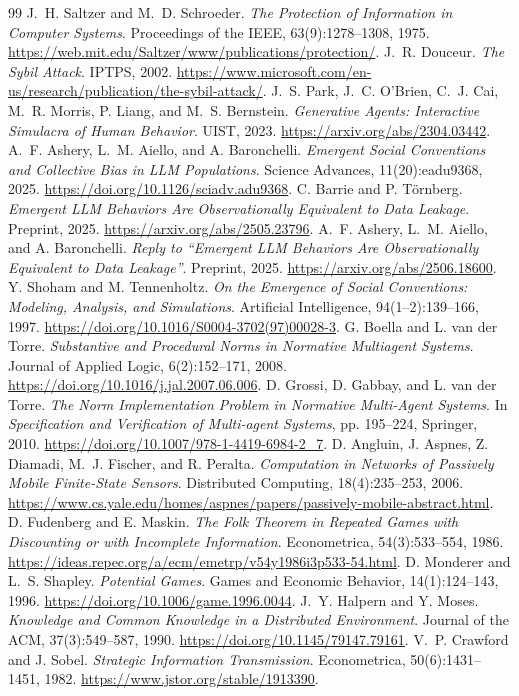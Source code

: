 \documentclass[11pt,oneside,openany]{book}
\numberwithin{equation}{section}
\begin{document}
\begin{thebibliography}{99}
 J.~H. Saltzer and M.~D. Schroeder. \emph{The Protection of Information in Computer Systems}. Proceedings of the IEEE, 63(9):1278--1308, 1975. \url{https://web.mit.edu/Saltzer/www/publications/protection/}.
 J.~R. Douceur. \emph{The Sybil Attack}. IPTPS, 2002. \url{https://www.microsoft.com/en-us/research/publication/the-sybil-attack/}.
 J.~S. Park, J.~C. O'Brien, C.~J. Cai, M.~R. Morris, P. Liang, and M.~S. Bernstein. \emph{Generative Agents: Interactive Simulacra of Human Behavior}. UIST, 2023. \url{https://arxiv.org/abs/2304.03442}.
 A.~F. Ashery, L.~M. Aiello, and A. Baronchelli. \emph{Emergent Social Conventions and Collective Bias in LLM Populations}. Science Advances, 11(20):eadu9368, 2025. \url{https://doi.org/10.1126/sciadv.adu9368}.
 C. Barrie and P. T\"ornberg. \emph{Emergent LLM Behaviors Are Observationally Equivalent to Data Leakage}. Preprint, 2025. \url{https://arxiv.org/abs/2505.23796}.
 A.~F. Ashery, L.~M. Aiello, and A. Baronchelli. \emph{Reply to ``Emergent LLM Behaviors Are Observationally Equivalent to Data Leakage''}. Preprint, 2025. \url{https://arxiv.org/abs/2506.18600}.
 Y. Shoham and M. Tennenholtz. \emph{On the Emergence of Social Conventions: Modeling, Analysis, and Simulations}. Artificial Intelligence, 94(1--2):139--166, 1997. \url{https://doi.org/10.1016/S0004-3702(97)00028-3}.
 G. Boella and L. van der Torre. \emph{Substantive and Procedural Norms in Normative Multiagent Systems}. Journal of Applied Logic, 6(2):152--171, 2008. \url{https://doi.org/10.1016/j.jal.2007.06.006}.
 D. Grossi, D. Gabbay, and L. van der Torre. \emph{The Norm Implementation Problem in Normative Multi-Agent Systems}. In \emph{Specification and Verification of Multi-agent Systems}, pp. 195--224, Springer, 2010. \url{https://doi.org/10.1007/978-1-4419-6984-2_7}.
 D. Angluin, J. Aspnes, Z. Diamadi, M.~J. Fischer, and R. Peralta. \emph{Computation in Networks of Passively Mobile Finite-State Sensors}. Distributed Computing, 18(4):235--253, 2006. \url{https://www.cs.yale.edu/homes/aspnes/papers/passively-mobile-abstract.html}.
 D. Fudenberg and E. Maskin. \emph{The Folk Theorem in Repeated Games with Discounting or with Incomplete Information}. Econometrica, 54(3):533--554, 1986. \url{https://ideas.repec.org/a/ecm/emetrp/v54y1986i3p533-54.html}.
 D. Monderer and L.~S. Shapley. \emph{Potential Games}. Games and Economic Behavior, 14(1):124--143, 1996. \url{https://doi.org/10.1006/game.1996.0044}.
 J.~Y. Halpern and Y. Moses. \emph{Knowledge and Common Knowledge in a Distributed Environment}. Journal of the ACM, 37(3):549--587, 1990. \url{https://doi.org/10.1145/79147.79161}.
 V.~P. Crawford and J. Sobel. \emph{Strategic Information Transmission}. Econometrica, 50(6):1431--1451, 1982. \url{https://www.jstor.org/stable/1913390}.


\end{thebibliography}
\end{document}
